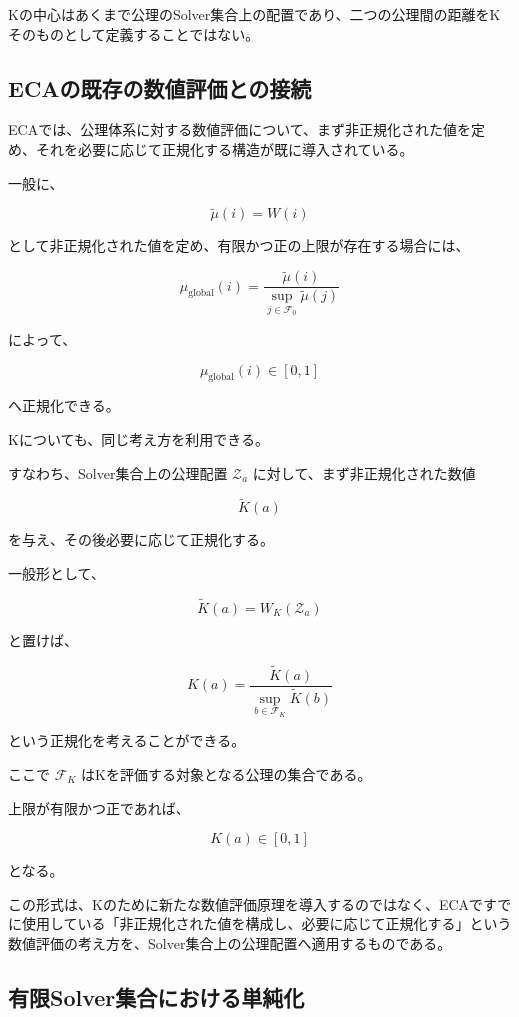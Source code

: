 Kの中心はあくまで公理のSolver集合上の配置であり、二つの公理間の距離をKそのものとして定義することではない。

\subsection{ECAの既存の数値評価との接続}

ECAでは、公理体系に対する数値評価について、まず非正規化された値を定め、それを必要に応じて正規化する構造が既に導入されている。

一般に、

\[
\widetilde\mu(i) = W(i)
\]

として非正規化された値を定め、有限かつ正の上限が存在する場合には、

\[
\mu_{\mathrm{global}}(i) = \frac{\widetilde\mu(i)}{\sup_{j\in\mathcal{F}_0}\widetilde\mu(j)}
\]

によって、

\[
\mu_{\mathrm{global}}(i)\in[0,1]
\]

へ正規化できる。

Kについても、同じ考え方を利用できる。

すなわち、Solver集合上の公理配置 $\mathcal{Z}_a$ に対して、まず非正規化された数値

\[
\widetilde{K}(a)
\]

を与え、その後必要に応じて正規化する。

一般形として、

\[
\widetilde{K}(a) = W_K(\mathcal{Z}_a)
\]

と置けば、

\[
K(a) = \frac{\widetilde{K}(a)}{\sup_{b\in\mathcal{F}_K}\widetilde{K}(b)}
\]

という正規化を考えることができる。

ここで $\mathcal{F}_K$ はKを評価する対象となる公理の集合である。

上限が有限かつ正であれば、

\[
K(a)\in[0,1]
\]

となる。

この形式は、Kのために新たな数値評価原理を導入するのではなく、ECAですでに使用している「非正規化された値を構成し、必要に応じて正規化する」という数値評価の考え方を、Solver集合上の公理配置へ適用するものである。

\subsection{有限Solver集合における単純化}

